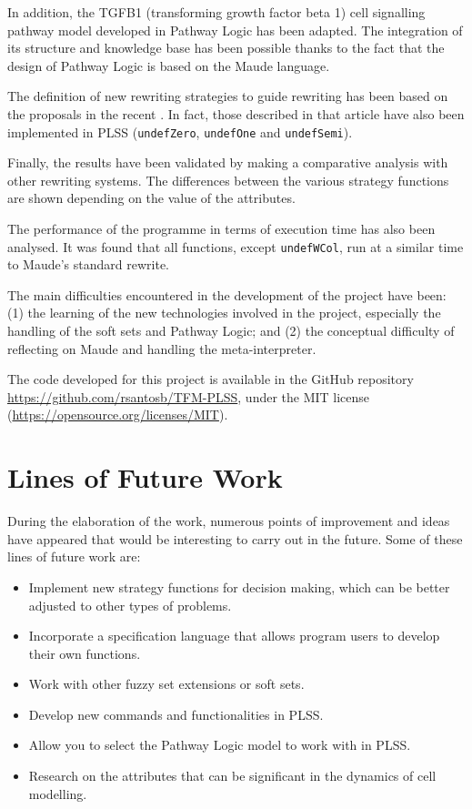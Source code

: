 In addition, the TGFB1 (transforming growth factor beta 1) cell signalling pathway model developed in Pathway Logic has been adapted.
The integration of its structure and knowledge base has been possible thanks to the fact that the design of Pathway Logic is based on the Maude language.

The definition of new rewriting strategies to guide rewriting has been based on the proposals in the recent \citet{santos2019soft}.
In fact, those described in that article have also been implemented in PLSS (\texttt{undefZero}, \texttt{undefOne} and \texttt{undefSemi}).

Finally, the results have been validated by making a comparative analysis with other rewriting systems. 
The differences between the various strategy functions are shown depending on the value of the attributes.

The performance of the programme in terms of execution time has also been analysed. It was found that all functions, except \texttt{undefWCol}, run at a similar time to Maude's standard rewrite.
\medskip


The main difficulties encountered in the development of the project have been:
(1) the learning of the new technologies involved in the project, especially the handling of the soft sets and Pathway Logic; and 
(2) the conceptual difficulty of reflecting on Maude and handling the meta-interpreter.
\medskip


The code developed for this project is available in the GitHub repository
\url{https://github.com/rsantosb/TFM-PLSS}, under the MIT license (\url{https://opensource.org/licenses/MIT}).



\section{Lines of Future Work}

During the elaboration of the work, numerous points of improvement and ideas have appeared that would be interesting to carry out in the future. 
Some of these lines of future work are:
\begin{itemize}
\item Implement new strategy functions for decision making, which can be better adjusted to other types of problems.

\item Incorporate a specification language that allows program users to develop their own functions.

\item Work with other fuzzy set extensions or soft sets.

\item Develop new commands and functionalities in PLSS.

\item Allow you to select the Pathway Logic model to work with in PLSS.

\item Research on the attributes that can be significant in the dynamics of cell modelling.
\end{itemize}


